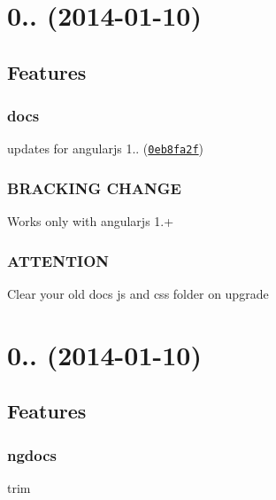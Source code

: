 \section*{0.. (2014-\/01-\/10)}

\subsection*{Features}

\subsubsection*{docs}


\begin{DoxyItemize}
\item updates for angularjs 1.. (\href{https://github.com/m7r/grunt-ngdocs/commit/0eb8fa2f}{\tt 0eb8fa2f})
\end{DoxyItemize}

\subsubsection*{B\+R\+A\+C\+K\+I\+N\+G C\+H\+A\+N\+G\+E}

Works only with angularjs 1.+

\subsubsection*{A\+T\+T\+E\+N\+T\+I\+O\+N}

Clear your old docs js and css folder on upgrade

\section*{0.. (2014-\/01-\/10)}

\subsection*{Features}

\subsubsection*{ngdocs}


\begin{DoxyItemize}
\item trim 
\end{DoxyItemize}